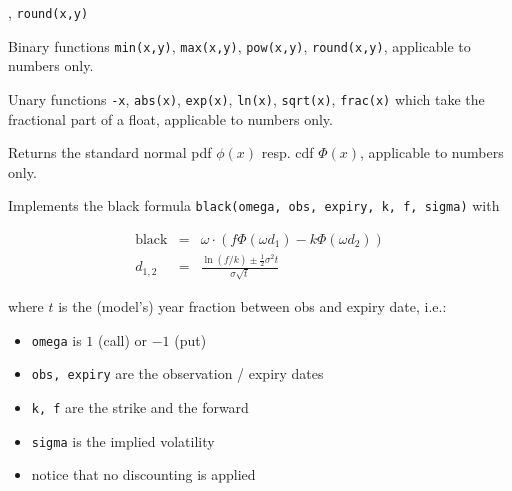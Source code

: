 , {\tt round(x,y)}

Binary functions {\tt min(x,y)}, {\tt max(x,y)}, {\tt pow(x,y)}, {\tt round(x,y)}, applicable to numbers only.


Unary functions {\tt -x}, {\tt abs(x)}, {\tt exp(x)}, {\tt ln(x)}, {\tt sqrt(x)}, {\tt frac(x)} which take the fractional part of a float, applicable to numbers only.


Returns the standard normal pdf $\phi(x)$ resp. cdf $\Phi(x)$, applicable to numbers only.


Implements the black formula {\tt black(omega, obs, expiry, k, f, sigma)} with

\begin{eqnarray*}
  \text{black} &=&  \omega\cdot(f \Phi(\omega d_1) -k \Phi(\omega d_2)) \\
  d_{1,2} &=& \frac{\ln(f/k) \pm \frac{1}{2} \sigma^2t}{\sigma\sqrt{t}}
\end{eqnarray*}
    
where $t$ is the (model's) year fraction between obs and expiry date, i.e.:
\begin{itemize}
\item {\tt omega} is $1$ (call) or $-1$ (put)
\item {\tt obs, expiry} are the observation / expiry dates
\item {\tt k, f} are the strike and the forward
\item {\tt sigma} is the implied volatility
\item notice that no discounting is applied
\end{itemize}


